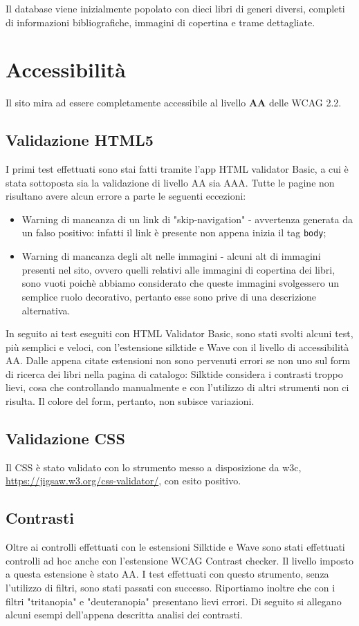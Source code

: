 \documentclass{article}
\begin{document}
Il database viene inizialmente popolato con dieci libri di generi diversi, completi di informazioni bibliografiche, immagini di copertina e trame dettagliate.

\newpage
\section{Accessibilità}
Il sito mira ad essere completamente accessibile al livello \textbf{AA} delle WCAG 2.2. 
\subsection{Validazione HTML5}
I primi test effettuati sono stai fatti tramite l'app HTML validator Basic, a cui è stata sottoposta sia la validazione di livello AA sia AAA. Tutte le pagine non risultano avere alcun errore a parte le seguenti eccezioni:
\begin{itemize}
    \item Warning di mancanza di un link di "skip-navigation" - avvertenza generata da un falso positivo: infatti il link è presente non appena inizia il tag \texttt{body};
    \item Warning di mancanza degli alt nelle immagini - alcuni alt di immagini presenti nel sito, ovvero quelli relativi alle immagini di copertina dei libri, sono vuoti poichè abbiamo considerato che queste immagini svolgessero un semplice ruolo decorativo, pertanto esse sono prive di una descrizione alternativa.
\end{itemize}

In seguito ai test eseguiti con HTML Validator Basic, sono stati svolti alcuni test, più semplici e veloci, con l'estensione silktide e Wave con il livello di accessibilità AA. Dalle appena citate estensioni non sono pervenuti errori se non uno sul form di ricerca dei libri nella pagina di catalogo: Silktide considera i contrasti troppo lievi, cosa che controllando manualmente e con l'utilizzo di altri strumenti non ci risulta. Il colore del form, pertanto, non subisce variazioni.

\subsection{Validazione CSS}
Il CSS è stato validato con lo strumento messo a disposizione da w3c, \url{https://jigsaw.w3.org/css-validator/}, con esito positivo.

\subsection{Contrasti}
Oltre ai controlli effettuati con le estensioni Silktide e Wave sono stati effettuati controlli ad hoc anche con l'estensione WCAG Contrast checker. Il livello imposto a questa estensione è stato AA. I test effettuati con questo strumento, senza l'utilizzo di filtri, sono stati passati con successo. Riportiamo inoltre che con i filtri "tritanopia" e "deuteranopia" presentano lievi errori. Di seguito si allegano alcuni esempi dell'appena descritta analisi dei contrasti.
\end{document}
